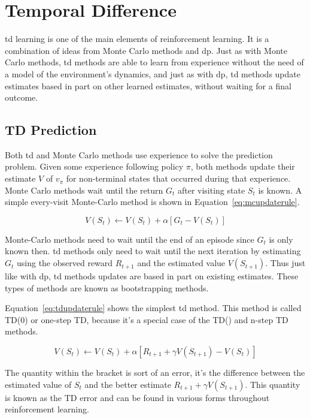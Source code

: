 \section{Temporal Difference}
\acrfull{td} learning is one of the main elements of reinforcement learning. It is a combination of ideas from Monte Carlo methods and \gls{dp}. Just as with Monte Carlo methods, \gls{td} methods are able to learn from experience without the need of a model of the environment's dynamics, and just as with \gls{dp}, \gls{td} methods update estimates based in part on other learned estimates, without waiting for a final outcome.

\subsection{TD Prediction}
Both \gls{td} and Monte Carlo methods use experience to solve the prediction problem. Given some experience following policy $\pi$, both methods update their estimate $V$ of $v_\pi$ for non-terminal states that occurred during that experience. Monte Carlo methods wait until the return $G_t$ after visiting state $S_t$ is known. A simple every-visit Monte-Carlo method is shown in Equation~\ref{eq:mcupdaterule}.


\begin{equation}
  \label{eq:mcupdaterule}
  V(S_t) \leftarrow V(S_t) + \alpha \left [  G_t - V(S_t) \right ]
\end{equation}

Monte-Carlo methods need to wait until the end of an episode since $G_t$ is only known then. \gls{td} methods only need to wait until the next iteration by estimating $G_t$ using the observed reward $R_{t+1}$ and the estimated value $V(S_{t+1})$. Thus just like with \gls{dp}, \gls{td} methods updates are based in part on existing estimates. These types of methods are known as bootstrapping methods.

Equation~\ref{eq:tdupdaterule} shows the simplest \gls{td} method. This method is called TD(0) or one-step TD, because it's a special case of the TD(\lambda) and n-step TD methods. 

\begin{equation}
  \label{eq:tdupdaterule}
  V(S_t) \leftarrow V(S_t) + \alpha \left [  R_{t+1} + \gamma V(S_{t+1})- V(S_t) \right ]
\end{equation}

The quantity within the bracket is sort of an error, it's the difference between the estimated value of $S_t$ and the better estimate $R_{t+1} + \gamma V(S_{t+1})$. This quantity is known as the TD error and can be found in various forms throughout reinforcement learning.

